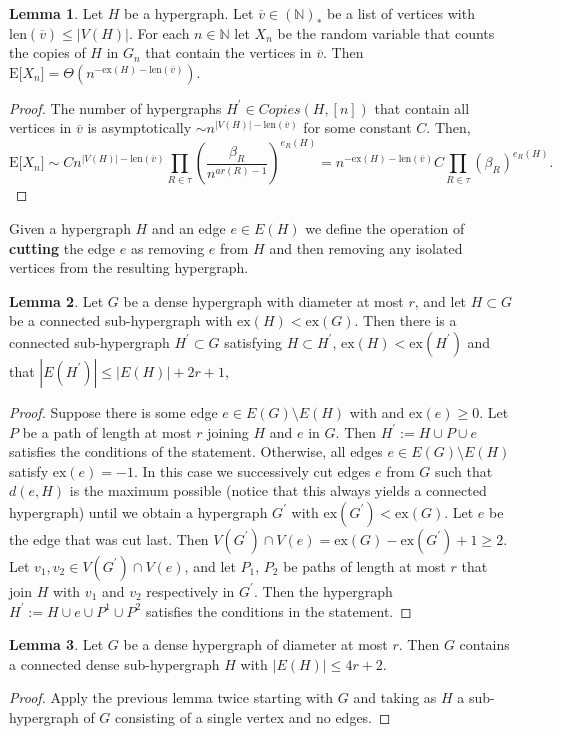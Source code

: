 \documentclass[12pt,notitlepage,a4paper]{article}
\theoremstyle{definition}
\newtheorem{lemma}{Lemma}[section]
\newcommand{\N}{\mathbb{N}}
\newcommand{\sep}{\noindent\rule{2cm}{0.4pt}}
\newcommand{\len}{\mathrm{len}}
\newcommand{\ex}{\mathrm{ex}}
\begin{document}
\begin{lemma}\label{lem:nocopiesfixed}
	Let $H$ be a hypergraph. Let
	$\overline{v}\in (\N)_*$ be a list of vertices
	with $\len(\overline{v})\leq |V(H)|$.
	For each $n\in \N$ 
	let $X_n$ be the random variable that
	counts the copies of $H$ in $G_n$ that contain the vertices
	in $\overline{v}$. Then
	$
	\mathrm{E}\big[ X_n \big]=\Theta(n^{-\ex(H)-\len(\overline{v})})$.
\end{lemma}
\begin{proof}
	The number of hypergraphs $H^\prime \in Copies(H,[n])$
	that contain all vertices in $\overline{v}$ is asymptotically
	$\sim n^{|V(H)|-\len(\overline{v})}$ for
	some constant $C$. Then,
	\[
	\mathrm{E}\big[ X_n \big]\sim 
	C   n^{|V(H)|-\len(\overline{v})}
	 \prod_{R\in\tau} \left( \frac{\beta_R}{n^{ar(R)-1}}\right)^{e_R(H)}=
	n^{-\ex(H)-\len(\overline{v})}  C  
	\prod_{R\in\tau} \left( \beta_R \right)^{e_R(H)}.
	\]
\end{proof}




	Given a hypergraph $H$ and an edge $e\in E(H)$ we
	define the operation of \textbf{cutting} the edge 
	$e$ as removing $e$ from $H$ and then removing any isolated
	vertices from the resulting hypergraph. \par

\begin{lemma}
	Let $G$ be a
	dense hypergraph with diameter at most $r$,
	and let $H\subset G$ be a connected 
	sub-hypergraph with $\ex(H)<\ex(G)$. Then
	there is a connected
	sub-hypergraph $H^\prime \subset G$
	satisfying $H\subset H^\prime$,
	$\ex(H)<\ex(H^\prime)$ and that 
	$|E(H^\prime)|\leq |E(H)|+2  r + 1$, 
\end{lemma}
\begin{proof}
	Suppose there is some edge $e\in E(G)\setminus E(H)$ with
	and $\ex(e)\geq 0$. Let $P$ be a path
	of length at most $r$ joining $H$ and $e$ in $G$. 
	Then $H^\prime:=H\cup P \cup e$ satisfies the conditions of 
	the statement. Otherwise, all edges $e\in E(G)\setminus E(H)$ 
	satisfy $\ex(e)=-1$. In this case we successively cut
	edges $e$ from $G$ such that $d(e, H)$ is the maximum possible
	(notice that this always yields a connected hypergraph)
	until we obtain a hypergraph $G^\prime$ with $\ex(G^\prime)<\ex(G)$.
	Let $e$ be the edge that was cut last. Then $V(G^\prime)\cap V(e)=
	\ex(G)-\ex(G^\prime)+1 \geq 2$. Let $v_1, v_2\in V(G^\prime)\cap V(e)$,
	and let $P_1$, $P_2$ be paths of length at most $r$ that join $H$
	with $v_1$ and $v_2$ respectively in $G^\prime$. Then the hypergraph
	$H^\prime:=H\cup e \cup P^1 \cup P^2$ satisfies the conditions 
	in the statement. 
\end{proof}
\begin{lemma}
	Let $G$ be a
	dense hypergraph of diameter at most 
	$r$. Then $G$ contains a connected 
	dense sub-hypergraph $H$ 
	with $|E(H)|\leq 4r+2$. 
\end{lemma}
\begin{proof}
	Apply the previous lemma twice starting with $G$ and taking
	as $H$ a sub-hypergraph of $G$ consisting of a single vertex and 
	no edges. 
\end{proof}
\end{document}

